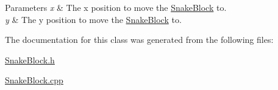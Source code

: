 \begin{DoxyParams}{\-Parameters}
{\em x} & \-The x position to move the \hyperlink{classSnakeBlock}{\-Snake\-Block} to. \\
\hline
{\em y} & \-The y position to move the \hyperlink{classSnakeBlock}{\-Snake\-Block} to. \\
\hline
\end{DoxyParams}


\-The documentation for this class was generated from the following files\-:\begin{DoxyCompactItemize}
\item 
\hyperlink{SnakeBlock_8h}{\-Snake\-Block.\-h}\item 
\hyperlink{SnakeBlock_8cpp}{\-Snake\-Block.\-cpp}\end{DoxyCompactItemize}

